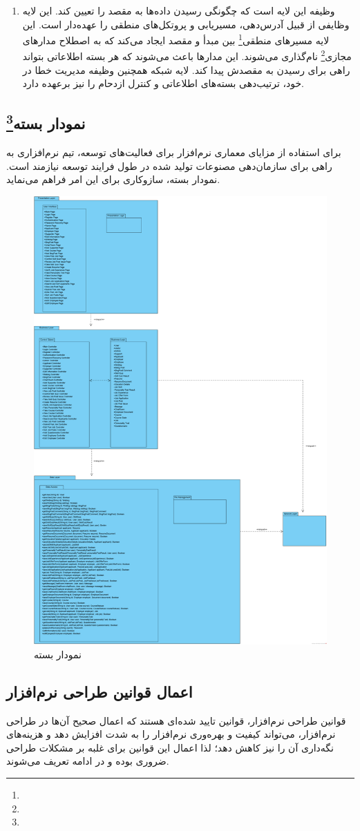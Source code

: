 \documentclass[12pt]{article}
\begin{document}
\begin{enumerate}
		\item {}
		وظیفه این لایه است که چگونگی رسیدن داده‌ها به مقصد را تعیین کند. این لایه وظایفی از قبیل آدرس‌دهی، مسیریابی و پروتکل‌های منطقی را عهده‌دار است. این لایه مسیرهای منطقی\footnote{} بین مبدأ و مقصد ایجاد می‌کند که به اصطلاح مدارهای مجازی\footnote{} نام‌گذاری می‌شوند. این مدارها باعث می‌شوند که هر بسته اطلاعاتی بتواند راهی برای رسیدن به مقصدش پیدا کند. لایه شبکه همچنین وظیفه مدیریت خطا در خود، ترتیب‌دهی بسته‌های اطلاعاتی و کنترل ازدحام را نیز برعهده دارد.

	\end{enumerate}

	\subsection{نمودار بسته\footnote{}}
	برای استفاده از مزایای معماری نرم‌افزار برای فعالیت‌های توسعه، تیم نرم‌افزاری به راهی برای سازمان‌دهی مصنوعات تولید شده در طول فرایند توسعه نیازمند است. نمودار بسته، سازوکاری برای این امر فراهم می‌نماید.
	\begin{figure}[H]
		\centering
		\includegraphics[width=0.5\linewidth]{files/Project_OOAD_Phase2_PackageDiagram}
		\caption{نمودار بسته}
		\label{fig:packagediagram}
	\end{figure}

	\subsection{اعمال قوانین طراحی نرم‌افزار}
	قوانین طراحی نرم‌افزار، قوانین تایید شده‌ای هستند که اعمال صحیح آن‌ها در طراحی نرم‌افزار، می‌تواند کیفیت و بهره‌وری نرم‌افزار را به شدت افزایش دهد و هزینه‌های نگه‌داری آن را نیز کاهش دهد؛ لذا اعمال این قوانین برای غلبه بر مشکلات طراحی ضروری بوده و در ادامه تعریف می‌شوند.
\end{document}
